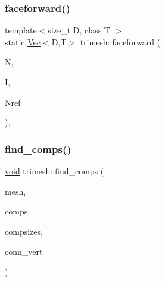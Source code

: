 \subsubsection{\texorpdfstring{faceforward()}{faceforward()}}
{\footnotesize\ttfamily template$<$size\+\_\+t D, class T $>$ \\
static \hyperlink{classtrimesh_1_1Vec}{Vec}$<$D,T$>$ trimesh\+::faceforward (\begin{DoxyParamCaption}\item[{const \hyperlink{classtrimesh_1_1Vec}{Vec}$<$ D, T $>$ \&}]{N,  }\item[{const \hyperlink{classtrimesh_1_1Vec}{Vec}$<$ D, T $>$ \&}]{I,  }\item[{const \hyperlink{classtrimesh_1_1Vec}{Vec}$<$ D, T $>$ \&}]{Nref }\end{DoxyParamCaption})\hspace{0.3cm}{\ttfamily [inline]}, {\ttfamily [static]}}

\mbox{\label{namespacetrimesh_aa156981b460de8fb61364a772aa767d1}} 
\subsubsection{\texorpdfstring{find\+\_\+comps()}{find\_comps()}\hspace{0.1cm}{\footnotesize\ttfamily [1/2]}}
{\footnotesize\ttfamily \hyperlink{namespacetrimesh_a784ddfd979e1c579bda795a8edfc3f43}{void} trimesh\+::find\+\_\+comps (\begin{DoxyParamCaption}\item[{\hyperlink{classtrimesh_1_1TriMesh}{Tri\+Mesh} $\ast$}]{mesh,  }\item[{vector$<$ int $>$ \&}]{comps,  }\item[{vector$<$ int $>$ \&}]{compsizes,  }\item[{bool}]{conn\+\_\+vert }\end{DoxyParamCaption})}

\mbox{\label{namespacetrimesh_a12c73eb3c766d6aeb4848749e7d2284f}} 
